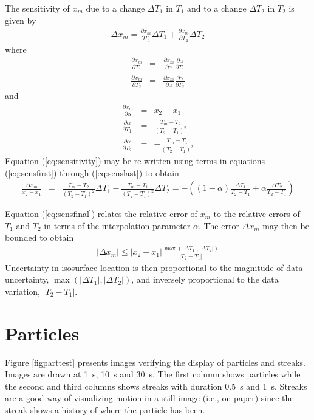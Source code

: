 \documentclass[11pt,twoside]{book}
\newcommand{\pxtone}{ \frac{\partial x_m}{\partial T_1} }
\newcommand{\pxttwo}{ \frac{\partial x_m}{\partial T_2} }
\newcommand{\pxalpha}{ \frac{\partial x_m}{\partial \alpha} }
\newcommand{\palphatone}{ \frac{\partial \alpha}{\partial T_1} }
\newcommand{\palphattwo}{ \frac{\partial \alpha}{\partial T_2} }
\begin{document}
\noindent The sensitivity of $x_m$ due to a change $\Delta T_1$ in $T_1$ and to a change $\Delta T_2$ in $T_2$ is given by
\begin{eqnarray}
\Delta x_m= \pxtone \Delta T_1 + \pxttwo \Delta T_2
\label{eq:sensitivity}
\end{eqnarray}
where
\begin{eqnarray}
\pxtone&=&\pxalpha\palphatone \label{eq:sensfirst}\\
\pxttwo&=&\pxalpha\palphattwo
\end{eqnarray}
and
\begin{eqnarray}
\pxalpha&=&x_2-x_1\\
\palphatone&=&\frac{T_m-T_2}{(T_2-T_1)^2}\\
\palphattwo&=&-\frac{T_m-T_1}{(T_2-T_1)^2}
\label{eq:senslast}
\end{eqnarray}
Equation (\ref{eq:sensitivity}) may be re-written using terms in equations (\ref{eq:sensfirst}) through (\ref{eq:senslast}) to obtain
\begin{eqnarray}
\frac{\Delta x_m}{x_2-x_1}&=&\frac{T_m-T_2}{(T_2-T_1)^2}\Delta T_1-
\frac{T_m-T_1}{(T_2-T_1)^2}\Delta T_2
=-\left(
(1-\alpha)\frac{\Delta T_1}{T_2-T_1}+
\alpha\frac{\Delta T_2}{T_2-T_1}\right)
\label{eq:sensfinal}
\end{eqnarray}

\noindent Equation (\ref{eq:sensfinal}) relates the relative error of $x_m$
to the relative errors of $T_1$ and $T_2$ in terms of the interpolation parameter $\alpha$.
The error $\Delta x_m$ may then be bounded to obtain
\begin{eqnarray}
|\Delta x_m|\le
|x_2-x_1|\frac{\max(|\Delta T_1|,|\Delta T_2|)}{|T_2-T_1|}
\end{eqnarray}
\noindent Uncertainty in isosurface location is then proportional to the magnitude of data uncertainty, $\max(|\Delta T_1|,|\Delta T_2|)$, and inversely proportional to the data variation, $|T_2-T_1|$.


\clearpage

\section{Particles}

Figure \ref{figparttest} presents images verifying the display of
particles and streaks. Images are drawn at 1~s, 10~s and
30~s. The first column shows particles while the second and
third columns shows streaks with duration 0.5~s and 1~s.
Streaks are a good way of visualizing motion in a still image
(i.e., on paper) since the streak shows a history of where the
particle has been.
\end{document}

